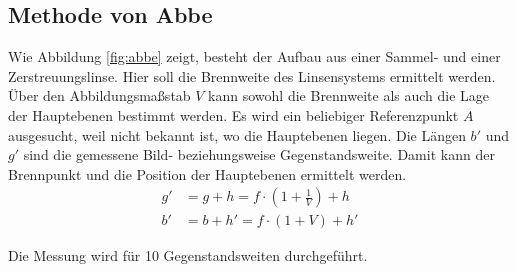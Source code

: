 \subsection{Methode von Abbe}
Wie Abbildung \ref{fig:abbe} zeigt, besteht der Aufbau aus einer Sammel- und einer Zerstreuungslinse. Hier soll die Brennweite des Linsensystems ermittelt werden. Über den Abbildungsmaßstab $V$ kann sowohl die Brennweite als auch die Lage der Hauptebenen bestimmt werden. Es wird ein beliebiger Referenzpunkt $A$ ausgesucht, weil nicht bekannt ist, wo die Hauptebenen liegen. Die Längen $b'$ und $g'$ sind die gemessene Bild- beziehungsweise Gegenstandsweite. Damit kann der Brennpunkt und die Position der Hauptebenen ermittelt werden.
\begin{align}
  g' &= g + h = f \cdot\left( 1+\frac{1}{V}\right)+h\\
  b' &= b + h' = f \cdot (1 + V) + h'
\end{align}

Die Messung wird für 10 Gegenstandsweiten durchgeführt.
